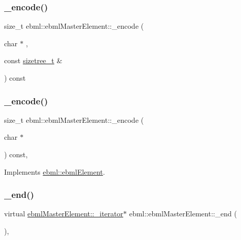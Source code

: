 \subsubsection{\texorpdfstring{\+\_\+encode()}{\_encode()}\hspace{0.1cm}{\footnotesize\ttfamily [1/2]}}
{\footnotesize\ttfamily size\+\_\+t ebml\+::ebml\+Master\+Element\+::\+\_\+encode (\begin{DoxyParamCaption}\item[{char $\ast$}]{,  }\item[{const \mbox{\hyperlink{structebml_1_1sizetree__t}{sizetree\+\_\+t}} \&}]{ }\end{DoxyParamCaption}) const\hspace{0.3cm}{\ttfamily [protected]}}

\mbox{\label{classebml_1_1ebmlMasterElement_aa0dd7215a5de90f8a52364df781952e2}} 
\subsubsection{\texorpdfstring{\+\_\+encode()}{\_encode()}\hspace{0.1cm}{\footnotesize\ttfamily [2/2]}}
{\footnotesize\ttfamily size\+\_\+t ebml\+::ebml\+Master\+Element\+::\+\_\+encode (\begin{DoxyParamCaption}\item[{char $\ast$}]{ }\end{DoxyParamCaption}) const\hspace{0.3cm}{\ttfamily [protected]}, {\ttfamily [virtual]}}



Implements \mbox{\hyperlink{classebml_1_1ebmlElement_a27bd9de14e1706840235b68331917776}{ebml\+::ebml\+Element}}.

\mbox{\label{classebml_1_1ebmlMasterElement_a352e5e11836063394990cb05c09d8e48}} 
\subsubsection{\texorpdfstring{\+\_\+end()}{\_end()}}
{\footnotesize\ttfamily virtual \mbox{\hyperlink{classebml_1_1ebmlMasterElement_1_1__iterator}{ebml\+Master\+Element\+::\+\_\+iterator}}$\ast$ ebml\+::ebml\+Master\+Element\+::\+\_\+end (\begin{DoxyParamCaption}{ }\end{DoxyParamCaption})\hspace{0.3cm}{\ttfamily [protected]}, {}}



